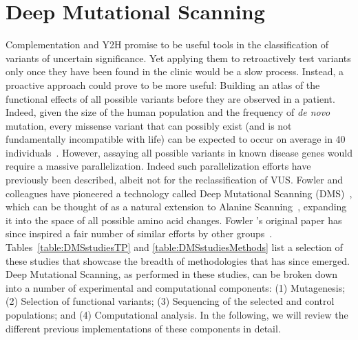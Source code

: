 \section{Deep Mutational Scanning}
\label{dmsIntro}

Complementation and Y2H promise to be useful tools in the classification of variants of uncertain significance. Yet applying them to retroactively test variants only once they have been found in the clinic would be a slow process. Instead, a proactive approach could prove to be more useful: Building an atlas of the functional effects of all possible variants before they are observed in a patient. Indeed, given the size of the human population and the frequency of \textit{de novo} mutation, every missense variant that can possibly exist (and is not fundamentally incompatible with life) can be expected to occur on average in 40 individuals~. However, assaying all possible variants in known disease genes would require a massive parallelization. Indeed such parallelization efforts have previously been described, albeit not for the reclassification of VUS. Fowler and colleagues have pioneered a technology called Deep Mutational Scanning (DMS)~\cite{fowler_high-resolution_2010}, which can be thought of as a natural extension to Alanine Scanning~\cite{cunningham_high-resolution_1989}, expanding it into the space of all possible amino acid changes. Fowler \etal's original paper has since inspired a fair number of similar efforts by other groups~\cite{ernst_coevolution_2010,hietpas_experimental_2011,fujino_robust_2012,adkar_protein_2012,mclaughlin_jr_spatial_2012,schlinkmann_critical_2012,whitehead_optimization_2012,traxlmayr_construction_2012,wu_systematic_2013,roscoe_analyses_2013,starita_activity-enhancing_2013,procko_computational_2013,tinberg_computational_2013,jiang_latent_2013,kim_high-throughput_2013,melamed_deep_2013,forsyth_deep_2013,wagenaar_resistance_2014,firnberg_comprehensive_2014,olson_comprehensive_2014,melnikov_comprehensive_2014,bloom_experimentally_2014,thyagarajan_inherent_2014,stiffler_evolvability_2015,doud_site-specific_2015,kitzman_massively_2015,starita_massively_2015,mishra_systematic_2016,doud_accurate_2016,mavor_determination_2016,majithia_prospective_2016}. Tables~\ref{table:DMSstudiesTP} and \ref{table:DMSstudiesMethods} list a selection of these studies that showcase the breadth of methodologies that has since emerged. 
Deep Mutational Scanning, as performed in these studies, can be broken down into a number of experimental and computational components: (1) Mutagenesis; (2) Selection of functional variants; (3) Sequencing of the selected and control populations; and (4) Computational analysis. In the following, we will review the different previous implementations of these components in detail.


